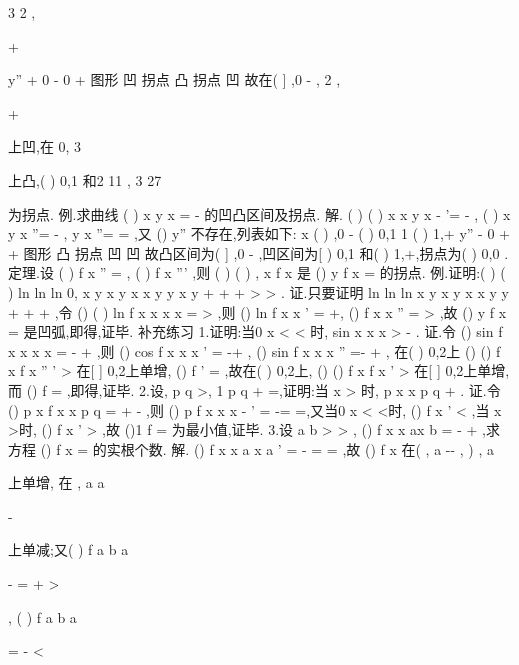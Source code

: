 3      2 ,


+\infty 




y''        +        0       -        0         + 
图形       凹      拐点      凸       拐点       凹 
故在(
]
,0
-\infty 
, 2 ,


+\infty 


上凹,在
0, 3






上凸,(
)
0,1 和2 11
,
3 27






为拐点. 
\textcolor{lyred}{例}.求曲线
(
)
x
y
x
=
-
的凹凸区间及拐点. 
解.
(
)
(
)
x
x
y
x
-
'=
-
,
(
)
x
y
x
''=
-
,
y
x
''=
\Rightarrow 
=
,又
()
y''
不存在,列表如下: 
x       (
)
,0
-      (
)
0,1       1      (
)
1,+\infty  
y''        -          0       +        \times         + 
图形       凸        拐点      凹        \times         凹 
故凸区间为(
]
,0
-\infty 
,凹区间为[
)
0,1 和(
)
1,+\infty ,拐点为(
)
0,0 . 
\textcolor{lyred}{定理}.设
(
)
f
x
''
=
,
(
)
f
x
'''
\neq 
,则
(
)
(
)
,
x
f x
是
()
y
f x
=
的拐点. 
\textcolor{lyred}{例}.证明:(
)
(
)
ln
ln
ln
0,
x
y
x
y
x
x
y
y x
y
+
+
\le 
+
>
>
. 
证.只要证明
ln
ln
ln
x
y
x
y
x
x
y
y
+
+
+
\le 
,令
()
(
)
ln
f x
x
x x
=
>
,则 
()
ln
f
x
x
'
=
+,
()
f
x
x
''
=
>
,故
()
y
f x
=
是凹弧,即得,证毕. 
\textcolor{lyred}{补充练习 }
1.证明:当0
x
\pi 
<
<
时,
sin
x
x
x
>
-
. 
证.令
()
sin
f x
x
x
x
=
-
+
,则
()
cos
f
x
x
x
'
=
-+
,
()
sin
f
x
x
x
''
=-
+
, 
在(
)
0,2\pi 上
()
()
f
x
f
x
''
'
>
\Rightarrow 
在[
]
0,2\pi 上单增,
()
f '
=
,故在(
)
0,2\pi 上, 
()
()
f
x
f x
'
>
\Rightarrow 
在[
]
0,2\pi 上单增,而
()
f
=
,即得,证毕. 
2.设,
p q >, 1
p
q
+
=,证明:当
x >
时,
p
x
x
p
q
+
\ge 
. 
证.令
()
p
x
f x
x
p
q
=
+
-
,则
()
p
f
x
x
x
-
'
=
-=
\Rightarrow 
=,又当0
x
<
<时, 
()
f
x
'
<
,当
x >时,
()
f
x
'
>
,故
()1
f
=
为最小值,证毕. 
3.设
a
b
>
>
,
()
f x
x
ax
b
=
-
+
,求方程
()
f x =
的实根个数. 
解.
()
f
x
x
a
x
a
'
=
-
=
\Rightarrow 
=\pm 
,故
()
f x 在(
,
a
-\infty -
,
)
,
a

\infty 

上单增, 
在
,
a
a


-

上单减;又(
)
f
a
b
a


-
=
+
>




, (
)
f
a
b
a


=
-
<




